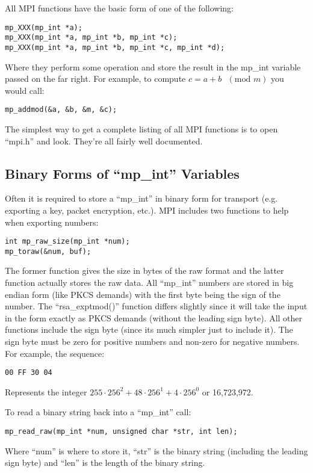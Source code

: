 \documentclass{book}
\begin{document}
All MPI functions have the basic form of one of the following:
\begin{verbatim}
mp_XXX(mp_int *a);
mp_XXX(mp_int *a, mp_int *b, mp_int *c);
mp_XXX(mp_int *a, mp_int *b, mp_int *c, mp_int *d);
\end{verbatim}

Where they perform some operation and store the result in the mp\_int variable passed on the far right.  For example, to
compute $c = a + b \mbox{ }(\mbox{mod }m)$ you would call:
\begin{verbatim}
mp_addmod(&a, &b, &m, &c);
\end{verbatim}

The simplest way to get a complete listing of all MPI functions is to open ``mpi.h'' and look.  They're all fairly 
well documented.

\subsection{Binary Forms of ``mp\_int'' Variables}

Often it is required to store a ``mp\_int'' in binary form for transport (e.g. exporting a key, packet encryption, etc.).
MPI includes two functions to help when exporting numbers:
\begin{verbatim}
int mp_raw_size(mp_int *num);
mp_toraw(&num, buf);
\end{verbatim}

The former function gives the size in bytes of the raw format and the latter function actually stores the raw data.  All
``mp\_int'' numbers are stored in big endian form (like PKCS demands) with the first byte being the sign of the number.  The
``rsa\_exptmod()'' function differs slightly since it will take the input in the form exactly as PKCS demands (without the
leading sign byte).  All other functions include the sign byte (since its much simpler just to include it).  The sign byte
must be zero for positive numbers and non-zero for negative numbers.  For example,
the sequence:
\begin{verbatim}
00 FF 30 04
\end{verbatim}
Represents the integer $255 \cdot 256^2 + 48 \cdot 256^1 + 4 \cdot 256^0$ or 16,723,972.

To read a binary string back into a ``mp\_int'' call:
\begin{verbatim}
mp_read_raw(mp_int *num, unsigned char *str, int len);
\end{verbatim}
Where ``num'' is where to store it, ``str'' is the binary string (including the leading sign byte) and ``len'' is the 
length of the binary string.
\end{document}
